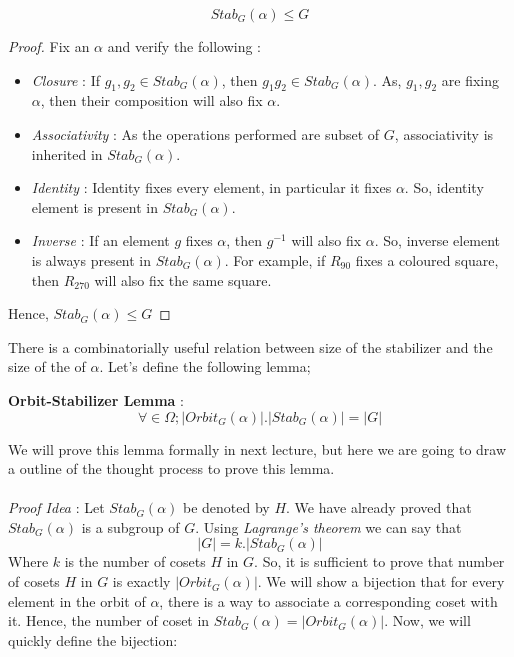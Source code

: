 \begin{claim}
$$Stab_G(\alpha)\leq G$$
\end{claim}
\begin{proof}
Fix an $\alpha$ and verify the following :
\begin{itemize}
\item \emph{Closure} : If $g_1,g_2\in Stab_G(\alpha)$, then $g_1g_2\in Stab_G(\alpha)$. As, $g_1,g_2$ are fixing $\alpha$, then their composition will also fix $\alpha$.
\item \emph{Associativity} : As the operations performed are subset of $G$, associativity is inherited in $Stab_G(\alpha)$.
\item \emph{Identity} : Identity fixes every element, in particular it fixes $\alpha$. So, identity element is present in $Stab_G(\alpha)$.
\item \emph{Inverse} : If an element $g$ fixes $\alpha$, then $g^{-1}$ will also fix $\alpha$. So, inverse element is always present in $Stab_G(\alpha)$. For example,   if $R_{90}$ fixes a coloured square, then $R_{270}$ will also fix the same square.
\end{itemize}
Hence, $Stab_G(\alpha)\leq G$
\end{proof}
There is a combinatorially useful relation between size of the stabilizer and the size of the of $\alpha$. Let's define the following lemma;
\begin{lemma}
\textbf{Orbit-Stabilizer Lemma} : $$\forall\in \Omega;|Orbit_G(\alpha)|.|Stab_G(\alpha)|=|G|$$
\end{lemma}
We will prove this lemma formally in next lecture, but here we are going to draw a outline of the thought process to prove this lemma.
\paragraph{}
\emph{Proof Idea} : Let $Stab_G(\alpha)$ be denoted by $H$. We have already proved that $Stab_G(\alpha)$ is a subgroup of $G$. Using \emph{Lagrange's theorem} we can say that $$|G|=k.|Stab_G(\alpha)|$$
Where $k$ is the number of cosets $H$ in $G$. So, it is sufficient to prove that number of cosets $H$ in $G$ is exactly $|Orbit_G(\alpha)|$. We will show a bijection that for every element in the orbit of $\alpha$, there is a way to associate a corresponding coset with it. Hence, the number of coset in $Stab_G(\alpha) =|Orbit_G(\alpha)|$. Now, we will quickly define the bijection:
